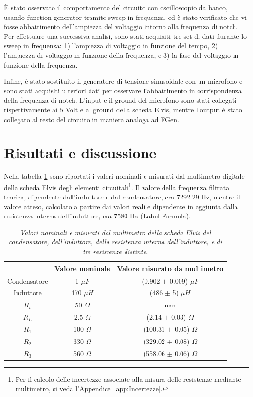 \documentclass[12pt]{article}
\numberwithin{equation}{section}
\begin{document}
È stato osservato il comportamento del circuito con oscilloscopio da banco, usando function generator tramite sweep in frequenza, ed è stato verificato che vi fosse abbattimento dell'ampiezza del voltaggio intorno alla frequenza di notch.
Per effettuare una successiva analisi, sono stati acquisiti tre set di dati durante lo sweep in frequenza: 1) l'ampiezza di voltaggio in funzione del tempo, 2) l'ampiezza di voltaggio in funzione della frequenza, e 3) la fase del voltaggio in funzione della frequenza.

Infine, è stato sostituito il generatore di tensione sinusoidale con un microfono e sono stati acquisiti ulteriori dati per osservare l'abbattimento in corrispondenza della frequenza di notch. 
L'input e il ground del microfono sono stati collegati rispettivamente ai 5 Volt e al ground della scheda Elvis, mentre l'output è stato collegato al resto del circuito in maniera analoga ad FGen.

\section{Risultati e discussione}

Nella tabella \ref{tab:valori} sono riportati i valori nominali e misurati dal multimetro digitale della scheda Elvis degli elementi circuitali\footnote{Per il calcolo delle incertezze associate alla misura delle resistenze mediante multimetro, si veda l'Appendice~\ref{app:Incertezze}.}.
Il valore della frequenza filtrata teorica, dipendente dall'induttore e dal condensatore, era 7292.29 Hz, mentre il valore atteso, calcolato a partire dai valori reali e dipendente in aggiunta dalla resistenza interna dell'induttore, era 7580 Hz (Label Formula).  

\begin{table}[H]
\centering
\begin{tabular}{||c | c | c ||} 
 \hline
 & Valore nominale & Valore misurato da multimetro \\ [0.5ex] 
 \hline\hline
 Condensatore & 1 $ \mu F$ & (0.902 $\pm$ 0.009) $ \mu F$ \\
 \hline
 Induttore & 470 $ \mu H$ & (486 $\pm$ 5) $ \mu H$ \\ 
 \hline
 $R_v$ & 50 $\Omega$ & nan \\
 \hline
 $R_{L}$ & 2.5 $ \Omega $ & (2.14 $\pm$ 0.03) $ \Omega $ \\
 \hline
 $R_{1}$ & 100 $ \Omega $ & (100.31 $\pm$ 0.05) $\Omega$ \\
 \hline
 $R_{2}$ & 330 $\Omega$& (329.02 $\pm$ 0.08) $\Omega$ \\ 
 \hline
 $R_{3}$ & 560 $\Omega$ & (558.06 $\pm$ 0.06) $\Omega$ \\
 \hline
\end{tabular}
\caption{\textit{Valori nominali e misurati dal multimetro della scheda Elvis del condensatore, dell'induttore, della resistenza interna dell'induttore, e di tre resistenze distinte.}}
\label{tab:valori}
\end{table}
\end{document}
